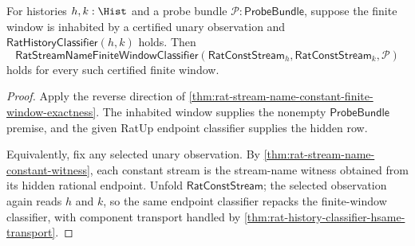 \begin{theorem}
\label{thm:rat-const-stream-prefix-window-completeness}
For histories $h,k:\Hist$ and a probe bundle
$\mathcal{P}:\mathsf{ProbeBundle}$, suppose the finite window is inhabited by
a certified unary observation and
$\mathsf{RatHistoryClassifier}(h,k)$ holds. Then
$$
\mathsf{RatStreamNameFiniteWindowClassifier}(\mathsf{RatConstStream}_h,
\mathsf{RatConstStream}_k,\mathcal{P})
$$
holds for every such certified finite window.
\end{theorem}
\begin{proof}
Apply the reverse direction of
\autoref{thm:rat-stream-name-constant-finite-window-exactness}. The inhabited
window supplies the nonempty $\mathsf{ProbeBundle}$ premise, and the given
RatUp endpoint classifier supplies the hidden row.

Equivalently, fix any selected unary observation. By
\autoref{thm:rat-stream-name-constant-witness}, each constant stream is the
stream-name witness obtained from its hidden rational endpoint. Unfold
$\mathsf{RatConstStream}$; the selected observation again reads $h$ and $k$,
so the same endpoint classifier repacks the finite-window classifier, with
component transport handled by
\autoref{thm:rat-history-classifier-hsame-transport}.
\end{proof}

